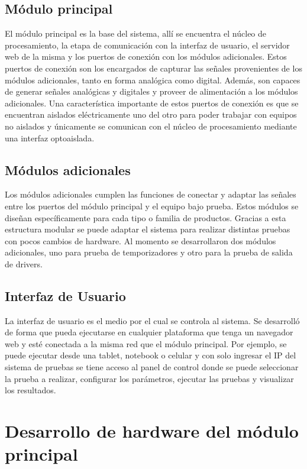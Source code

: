 \subsection{Módulo principal}
El módulo principal es la base del sistema, allí se encuentra el núcleo de procesamiento, la etapa de comunicación con la interfaz de usuario, el servidor web de la misma y los puertos de conexión con los módulos adicionales. Estos puertos de conexión son los encargados de capturar las señales provenientes de los módulos adicionales, tanto en forma analógica como digital. Además, son capaces de generar señales analógicas y digitales y proveer de alimentación a los módulos adicionales.
Una característica importante de estos puertos de conexión es que se encuentran aislados eléctricamente uno del otro para poder trabajar con equipos no aislados y únicamente se  comunican con el núcleo de procesamiento mediante una interfaz optoaislada.

\subsection{Módulos adicionales}
Los módulos adicionales cumplen las funciones de conectar y adaptar las señales entre los puertos del módulo principal y el equipo bajo prueba. Estos módulos se diseñan específicamente para cada tipo o familia de productos. Gracias a esta estructura modular se puede adaptar el sistema para realizar distintas pruebas con pocos cambios de hardware.
Al momento se desarrollaron dos módulos adicionales, uno para prueba de temporizadores y otro para la prueba de salida de drivers.

\subsection{Interfaz de Usuario}
La interfaz de usuario es el medio por el cual se controla al sistema. Se desarrolló de forma que pueda ejecutarse en cualquier plataforma que tenga un navegador web y esté conectada a la misma red que el módulo principal. Por ejemplo, se puede ejecutar desde una tablet, notebook o celular y con solo ingresar el IP del sistema de pruebas se tiene acceso al panel de control donde se puede seleccionar la prueba a realizar, configurar los parámetros, ejecutar las pruebas y visualizar los resultados.

\section{Desarrollo de hardware del módulo principal}

